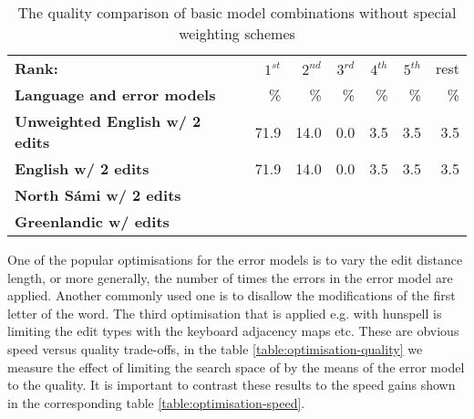 \documentclass[a4paper,12pt]{article}
\begin{document}
\begin{table}
    \centering
    \begin{tabular}{|l|r|r|r|r|r|r|}
        \hline
        \bf Rank: & $1^{st}$ & $2^{nd}$ & $3^{rd}$ & $4^{th}$ & $5^{th}$ & rest \\
        \bf Language and error models &  \% & \% & \% & \% & \% & \% \\
        \hline
\bf Unweighted English w/ 2 edits & 71.9 & 14.0 & 0.0 & 3.5 & 3.5 & 3.5 \\
        \bf English w/ 2 edits & 71.9 & 14.0 & 0.0 & 3.5 & 3.5 & 3.5 \\
        \hline
        \bf North Sámi w/ 2 edits & & & & & \\
        \hline
        \bf Greenlandic w/ edits & & & & & \\
        \hline
    \end{tabular}
    \caption{The quality comparison of basic model combinations without special
    weighting schemes\label{table:baseline-quality}}
\end{table}

One of the popular optimisations for the error models is to vary the edit
distance length, or more generally, the number of times the errors in the error
model are applied.  Another commonly used one is to disallow the modifications
of the first letter of the word. The third optimisation that is applied e.g.
with hunspell is limiting the edit types with the keyboard adjacency maps etc.
These are obvious speed versus quality trade-offs, in the table
\ref{table:optimisation-quality} we measure the effect of limiting the search
space of by the means of the error model to the quality. It is important to
contrast these results to the speed gains shown in the corresponding table
\ref{table:optimisation-speed}.
\end{document}
